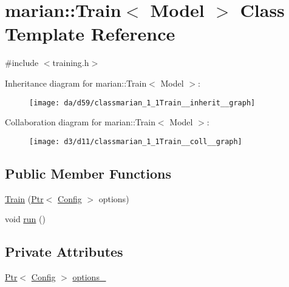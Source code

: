 \hypertarget{classmarian_1_1Train}{}\section{marian\+:\+:Train$<$ Model $>$ Class Template Reference}
\label{classmarian_1_1Train}


{\ttfamily \#include $<$training.\+h$>$}



Inheritance diagram for marian\+:\+:Train$<$ Model $>$\+:
\nopagebreak
\begin{figure}[H]
\begin{center}
\leavevmode
\texttt{[image: da/d59/classmarian\_1\_1Train\_\_inherit\_\_graph]}
\end{center}
\end{figure}


Collaboration diagram for marian\+:\+:Train$<$ Model $>$\+:
\nopagebreak
\begin{figure}[H]
\begin{center}
\leavevmode
\texttt{[image: d3/d11/classmarian\_1\_1Train\_\_coll\_\_graph]}
\end{center}
\end{figure}
\subsection*{Public Member Functions}
\begin{DoxyCompactItemize}
\item 
\hyperlink{classmarian_1_1Train_aaa745b384c05239d118c745815143afa}{Train} (\hyperlink{namespacemarian_ad1a373be43a00ef9ce35666145137b08}{Ptr}$<$ \hyperlink{classmarian_1_1Config}{Config} $>$ options)
\item 
void \hyperlink{classmarian_1_1Train_afb36c886041a3da8e8d7cf91b5088d51}{run} ()
\end{DoxyCompactItemize}
\subsection*{Private Attributes}
\begin{DoxyCompactItemize}
\item 
\hyperlink{namespacemarian_ad1a373be43a00ef9ce35666145137b08}{Ptr}$<$ \hyperlink{classmarian_1_1Config}{Config} $>$ \hyperlink{classmarian_1_1Train_ade849d6d35d7233dda8b58114c9c30a9}{options\+\_\+}
\end{DoxyCompactItemize}


